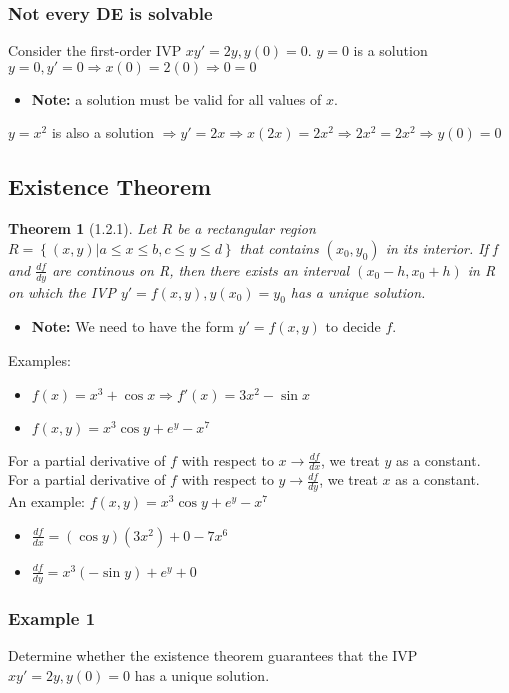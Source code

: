\documentclass{article}
\newtheorem{theorem}{Theorem}[section]
\begin{document}
\subsubsection{Not every DE is solvable}
Consider the first-order IVP $xy'=2y,y(0)=0$. $y=0$ is a solution $y=0,y'=0 \Rightarrow x(0)=2(0) \Rightarrow 0=0$
\begin{itemize}
    \itemsep 0em
    \item \textbf{Note:} a solution must be valid for all values of $x$.
\end{itemize}
$y=x^2$ is also a solution $\Rightarrow y'=2x \Rightarrow x(2x)=2x^2\Rightarrow 2x^2=2x^2\Rightarrow y(0)=0$

\subsection{Existence Theorem}
\begin{theorem}[1.2.1]
    Let $R$ be a rectangular region $R=\left\{ (x,y) | a\leq x\leq b, c\leq y\leq d\right\}$ that contains $(x_0,y_0)$ in its interior.
    If f and $\frac{df}{dy}$ are continous on R, then there exists an interval $(x_0-h,x_0+h)$ in R on which the IVP
    $y'=f(x,y), y(x_0)=y_0$ has a unique solution.
\end{theorem}
\begin{itemize}
    \item \textbf{Note: } We need to have the form $y'=f(x,y)$ to decide $f$.
\end{itemize}
Examples:
\begin{itemize}
    \item $f(x)=x^3+\cos{x}\Rightarrow f'(x)=3x^2-\sin{x}$
    \item $f(x,y)=x^3\cos{y}+e^y-x^7$
\end{itemize}
For a partial derivative of $f$ with respect to $x\rightarrow\frac{df}{dx}$, we treat $y$ as a constant. \\
For a partial derivative of $f$ with respect to $y\rightarrow\frac{df}{dy}$, we treat $x$ as a constant. \\
An example: $f(x,y)=x^3\cos{y}+e^y-x^7$
\begin{itemize}
    \item $\frac{df}{dx}=(\cos{y})(3x^2)+0-7x^6$
    \item $\frac{df}{dy}=x^3(-\sin{y})+e^y+0$
\end{itemize}

\subsubsection{Example 1}
Determine whether the existence theorem guarantees that the IVP $xy'=2y, y(0)=0$ has a unique solution.
\end{document}
